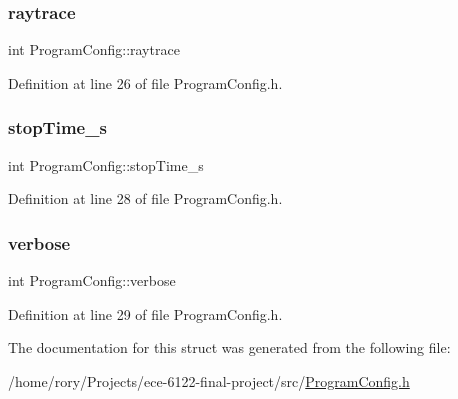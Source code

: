 \subsubsection{\texorpdfstring{raytrace}{raytrace}}
{\footnotesize\ttfamily int Program\+Config\+::raytrace}



Definition at line 26 of file Program\+Config.\+h.

\mbox{\label{struct_program_config_a19e30fc75258bd6a0d571432cb8c28ed}} 
\subsubsection{\texorpdfstring{stop\+Time\+\_\+s}{stopTime\_s}}
{\footnotesize\ttfamily int Program\+Config\+::stop\+Time\+\_\+s}



Definition at line 28 of file Program\+Config.\+h.

\mbox{\label{struct_program_config_ad059c9912c59ac0e8271114a4bb87c98}} 
\subsubsection{\texorpdfstring{verbose}{verbose}}
{\footnotesize\ttfamily int Program\+Config\+::verbose}



Definition at line 29 of file Program\+Config.\+h.



The documentation for this struct was generated from the following file\+:\begin{DoxyCompactItemize}
\item 
/home/rory/\+Projects/ece-\/6122-\/final-\/project/src/\hyperlink{_program_config_8h}{Program\+Config.\+h}\end{DoxyCompactItemize}
